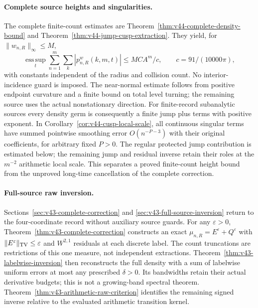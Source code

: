\documentclass[11pt,reqno]{amsart}
\numberwithin{equation}{section}
\theoremstyle{definition}\newtheorem{definition}[theorem]{Definition}
\theoremstyle{remark}\newtheorem{remark}[theorem]{Remark}
\begin{document}
\paragraph{Complete source heights and singularities.}
The complete finite-count estimates are Theorem~\ref{thm:v44-complete-density-bound}
and Theorem~\ref{thm:v44-jump-cusp-extraction}. They yield, for
$\|w_{n,R}\|_\infty\le M$,
\[
 \operatorname*{ess\,sup}_{t}\sum_{n=1}^m\sum_k
       |p^w_{n,R}(k,m,t)|\le MCA^m/c,
 \qquad c=91/(10000\pi),
\]
with constants independent of the radius and collision count. No
interior-incidence guard is imposed. The near-normal estimate follows
from positive endpoint curvature and a finite bound on total level
turning; the remaining source uses the actual nonstationary direction.
For finite-record subanalytic sources every density germ is consequently
a finite jump plus terms with positive exponent. In
Corollary~\ref{cor:v44-cusp-local-scale}, all continuous singular terms
have summed pointwise smoothing error $O(n^{-P-3})$ with their original
coefficients, for arbitrary fixed $P>0$. The regular protected jump contribution is estimated below; the
remaining jump and residual inverse retain their roles at the
$m^{-2}$ arithmetic local scale.
This separates a proved finite-count height bound from the unproved
long-time cancellation of the complete correction.

\paragraph{Full-source raw inversion.}
Sections~\ref{sec:v43-complete-correction} and
\ref{sec:v43-full-source-inversion} return to the four-coordinate
record without auxiliary source guards. For any $\varepsilon>0$,
Theorem~\ref{thm:v43-complete-correction} constructs an exact
$\mu_{n,R}=E^\varepsilon+Q^\varepsilon$ with
$\|E^\varepsilon\|_{\operatorname{TV}}\le\varepsilon$ and $W^{2,1}$ residuals
at each discrete label. The count truncations are restrictions of this
one measure, not independent extractions. Theorem~\ref{thm:v43-labelwise-inversion}
then reconstructs the full density with a sum of labelwise uniform
errors at most any prescribed $\delta>0$. Its bandwidths retain their
actual derivative budgets; this is not a growing-band spectral theorem.
Theorem~\ref{thm:v43-arithmetic-raw-criterion} identifies the remaining
signed inverse relative to the evaluated arithmetic transition kernel.
\end{document}
